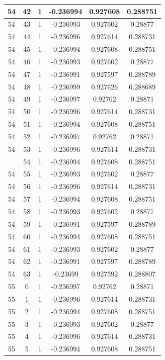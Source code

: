 \documentclass[12pt,a4paper]{article}
\numberwithin{equation}{section}
\numberwithin{figure}{section}
\numberwithin{table}{section}
\begin{document}
\begin{longtable}{|c|c|c|c|c|c|}
54 & 42 & 1 & -0.236994 & 0.927608 & 0.288751 \\ \hline
54 & 43 & 1 & -0.236993 & 0.927602 & 0.28877 \\ \hline
54 & 44 & 1 & -0.236996 & 0.927614 & 0.288731 \\ \hline
54 & 45 & 1 & -0.236994 & 0.927608 & 0.288751 \\ \hline
54 & 46 & 1 & -0.236993 & 0.927602 & 0.28877 \\ \hline
54 & 47 & 1 & -0.236991 & 0.927597 & 0.288789 \\ \hline
54 & 48 & 1 & -0.236999 & 0.927626 & 0.288689 \\ \hline
54 & 49 & 1 & -0.236997 & 0.92762 & 0.28871 \\ \hline
54 & 50 & 1 & -0.236996 & 0.927614 & 0.288731 \\ \hline
54 & 51 & 1 & -0.236994 & 0.927608 & 0.288751 \\ \hline
54 & 52 & 1 & -0.236997 & 0.92762 & 0.28871 \\ \hline
54 & 53 & 1 & -0.236996 & 0.927614 & 0.288731 \\ \hline
\pagebreak
54 & 54 & 1 & -0.236994 & 0.927608 & 0.288751 \\ \hline
54 & 55 & 1 & -0.236993 & 0.927602 & 0.28877 \\ \hline
54 & 56 & 1 & -0.236996 & 0.927614 & 0.288731 \\ \hline
54 & 57 & 1 & -0.236994 & 0.927608 & 0.288751 \\ \hline
54 & 58 & 1 & -0.236993 & 0.927602 & 0.28877 \\ \hline
54 & 59 & 1 & -0.236991 & 0.927597 & 0.288789 \\ \hline
54 & 60 & 1 & -0.236994 & 0.927608 & 0.288751 \\ \hline
54 & 61 & 1 & -0.236993 & 0.927602 & 0.28877 \\ \hline
54 & 62 & 1 & -0.236991 & 0.927597 & 0.288789 \\ \hline
54 & 63 & 1 & -0.23699 & 0.927592 & 0.288807 \\ \hline
55 & 0 & 1 & -0.236997 & 0.92762 & 0.28871 \\ \hline
55 & 1 & 1 & -0.236996 & 0.927614 & 0.288731 \\ \hline
55 & 2 & 1 & -0.236994 & 0.927608 & 0.288751 \\ \hline
55 & 3 & 1 & -0.236993 & 0.927602 & 0.28877 \\ \hline
55 & 4 & 1 & -0.236996 & 0.927614 & 0.288731 \\ \hline
55 & 5 & 1 & -0.236994 & 0.927608 & 0.288751 \\ \hline

\end{longtable}
\end{document}
